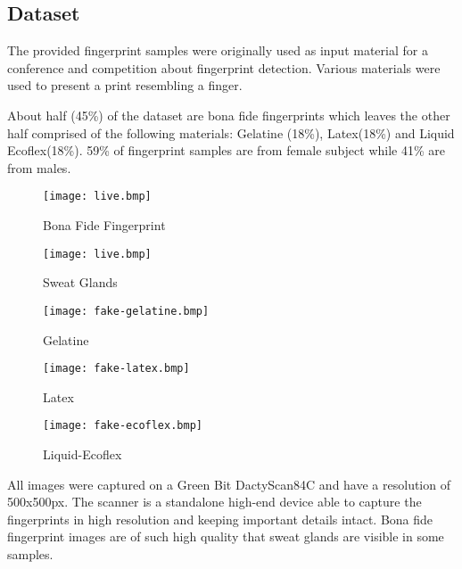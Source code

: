 \subsection{Dataset}
The provided fingerprint samples were originally used as input material for a conference and competition about fingerprint detection. Various materials were used to present a print resembling a finger. 

\smallskip\noindent
About half (45\%) of the dataset are bona fide fingerprints which leaves the other half comprised of the following materials: Gelatine (18\%), Latex(18\%) and Liquid Ecoflex(18\%). 59\% of fingerprint samples are from female subject while 41\% are from males.

\begin{figure}[!htb]
    \centering
    \begin{minipage}[c]{0.15\textwidth}
        \texttt{[image: live.bmp]}
        \caption{Bona Fide Fingerprint}\label{fig:finger-live}
    \end{minipage}
    \begin{minipage}[c]{0.15\textwidth}
        \texttt{[image: live.bmp]}
        \caption{Sweat Glands}\label{fig:finger-live}
    \end{minipage}
    \hspace{10mm}
    \begin{minipage}[c]{0.15\textwidth}
        \texttt{[image: fake-gelatine.bmp]}
        \caption{Gelatine}\label{fig:finger-gelatine}
    \end{minipage}
    \begin{minipage}[c]{0.15\textwidth}
        \texttt{[image: fake-latex.bmp]}
        \caption{Latex}\label{fig:finger-latex}
    \end{minipage}
    \begin{minipage}[c]{0.15\textwidth}
        \texttt{[image: fake-ecoflex.bmp]}
        \caption{Liquid-Ecoflex}\label{fig:finger-ecoflex}
        \label{img:ecoflex}
    \end{minipage}
\end{figure}

\noindent
All images were captured on a Green Bit DactyScan84C and have a resolution of 500x500px.
The scanner is a standalone high-end device able to capture the fingerprints in high resolution and keeping important details intact.
Bona fide fingerprint images are of such high quality that sweat glands are visible in some samples.

